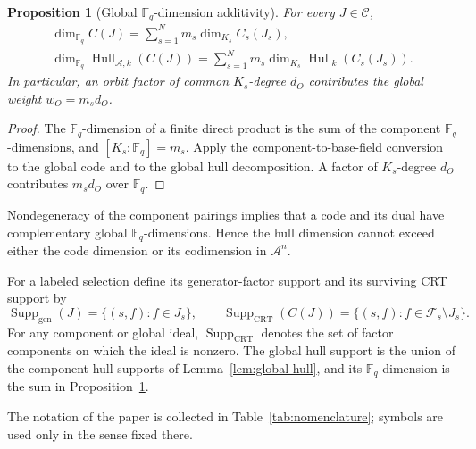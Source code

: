 \documentclass[10pt,a4paper]{article}
\newcommand{\F}{\mathbb F}
\newcommand{\A}{\mathcal A}
\newcommand{\Fs}{\mathcal F_s}
\newcommand{\Hull}{\operatorname{Hull}}
\numberwithin{equation}{section}
\theoremstyle{plain}
\newtheorem{proposition}[theorem]{Proposition}
\theoremstyle{definition}
\theoremstyle{remark}
\begin{document}
\begin{proposition}[Global $\F_q$-dimension additivity]\label{prop:global-dimensions}
For every $J\in\mathscr C$,
\[
\begin{gathered}
\dim_{\F_q}C(J)=\sum_{s=1}^{N}m_s\dim_{K_s}C_s(J_s),
\\
\dim_{\F_q}\Hull_{\A,k}(C(J))
 =\sum_{s=1}^{N}m_s\dim_{K_s}\Hull_k(C_s(J_s)).
\end{gathered}
\]
In particular, an orbit factor of common $K_s$-degree $d_O$ contributes the
global weight $w_O=m_s d_O$.
\end{proposition}

\begin{proof}
The $\F_q$-dimension of a finite direct product is the sum of the component
$\F_q$-dimensions, and $[K_s:\F_q]=m_s$. Apply the component-to-base-field
conversion to the global code and to the global hull decomposition. A factor of
$K_s$-degree $d_O$ contributes $m_s d_O$ over $\F_q$.
\end{proof}

Nondegeneracy of the component pairings implies that a code and its dual have
complementary global $\F_q$-dimensions. Hence the hull dimension cannot exceed
either the code dimension or its codimension in $\A^n$.

For a labeled selection define its generator-factor support and its surviving
CRT support by
\[
\operatorname{Supp}_{\mathrm{gen}}(J)=\{(s,f):f\in J_s\},
\qquad
\operatorname{Supp}_{\mathrm{CRT}}(C(J))
 =\{(s,f):f\in\Fs\setminus J_s\}.
\]
For any component or global ideal, $\operatorname{Supp}_{\mathrm{CRT}}$ denotes
the set of factor components on which the ideal is nonzero. The global hull
support is the union of the component hull supports of
Lemma~\ref{lem:global-hull}, and its $\F_q$-dimension is the sum in
Proposition~\ref{prop:global-dimensions}.

The notation of the paper is collected in Table~\ref{tab:nomenclature}; symbols
are used only in the sense fixed there.
\end{document}
